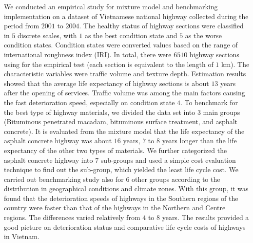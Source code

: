 We conducted an empirical study for mixture model and benchmarking implementation on a dataset of Vietnamese national highway collected during the period from $2001$ to $2004$. The healthy status of highway sections were classified in $5$ discrete scales, with $1$ as the best condition state and $5$ as the worse condition states. Condition states were converted values based on the range of international roughness index (IRI). In total, there were $6510$ highway sections using for the empirical test (each section is equivalent to the length of $1$ km). The characteristic variables were traffic volume and texture depth. Estimation results showed that the average life expectancy of highway sections is about $13$ years after the opening of services. Traffic volume was among the main factors causing the fast deterioration speed, especially on condition state $4$. To benchmark for the best type of highway materials, we divided the data set into $3$ main groups (Bituminous penetrated macadam, bituminous surface treatment, and asphalt concrete). It is evaluated from the mixture model that the life expectancy of the asphalt concrete highway was about $16$ years, $7$ to $8$ years longer than the life expectancy of the other two types of materials. We further categorized the asphalt concrete highway into $7$ sub-groups and used a simple cost evaluation technique to find out the sub-group, which yielded the least life cycle cost. We carried out benchmarking study also for $6$ other groups according to the distribution in geographical conditions and climate zones. With this group, it was found that the deterioration speeds of highways in the Southern regions of the country were faster than that of the highways in the Northern and Centre regions. The differences varied relatively from $4$ to $8$ years. The results provided a good picture on deterioration status and comparative life cycle costs of highways in Vietnam.
